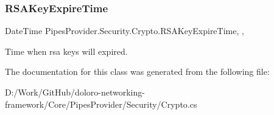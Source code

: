 \subsubsection{\texorpdfstring{R\+S\+A\+Key\+Expire\+Time}{RSAKeyExpireTime}}
{\footnotesize\ttfamily Date\+Time Pipes\+Provider.\+Security.\+Crypto.\+R\+S\+A\+Key\+Expire\+Time\hspace{0.3cm}{\ttfamily [static]}, {\ttfamily [get]}, {}}



Time when rsa keys will expired. 



The documentation for this class was generated from the following file\+:\begin{DoxyCompactItemize}
\item 
D\+:/\+Work/\+Git\+Hub/doloro-\/networking-\/framework/\+Core/\+Pipes\+Provider/\+Security/Crypto.\+cs\end{DoxyCompactItemize}
